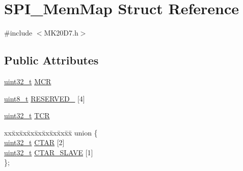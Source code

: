 \hypertarget{struct_s_p_i___mem_map}{}\section{S\+P\+I\+\_\+\+Mem\+Map Struct Reference}
\label{struct_s_p_i___mem_map}


{\ttfamily \#include $<$M\+K20\+D7.\+h$>$}

\subsection*{Public Attributes}
\begin{DoxyCompactItemize}
\item 
\hyperlink{_p_e___types_8h_a33594304e786b158f3fb30289278f5af}{uint32\+\_\+t} \hyperlink{struct_s_p_i___mem_map_a6474aa986b81a5477bbe4cb6a2dfe377}{M\+CR}
\item 
\hyperlink{_p_e___types_8h_aba7bc1797add20fe3efdf37ced1182c5}{uint8\+\_\+t} \hyperlink{struct_s_p_i___mem_map_a14519397e998939f8227f49844380512}{R\+E\+S\+E\+R\+V\+E\+D\+\_} \mbox{[}4\mbox{]}
\item 
\hyperlink{_p_e___types_8h_a33594304e786b158f3fb30289278f5af}{uint32\+\_\+t} \hyperlink{struct_s_p_i___mem_map_ab92eb6630f7fe6309c605f0155c3a4c9}{T\+CR}
\item 
\begin{tabbing}
xx\=xx\=xx\=xx\=xx\=xx\=xx\=xx\=xx\=\kill
union \{\\
\>\hyperlink{_p_e___types_8h_a33594304e786b158f3fb30289278f5af}{uint32\_t} \hyperlink{struct_s_p_i___mem_map_afe52c1ebf9e5971e43fdfea50cf16a48}{CTAR} \mbox{[}2\mbox{]}\\
\>\hyperlink{_p_e___types_8h_a33594304e786b158f3fb30289278f5af}{uint32\_t} \hyperlink{struct_s_p_i___mem_map_a4824e400ced2bf2bd5c89e95e7ef55d6}{CTAR\_SLAVE} \mbox{[}1\mbox{]}\\
\}; \\


\end{tabbing}
\end{DoxyCompactItemize}
